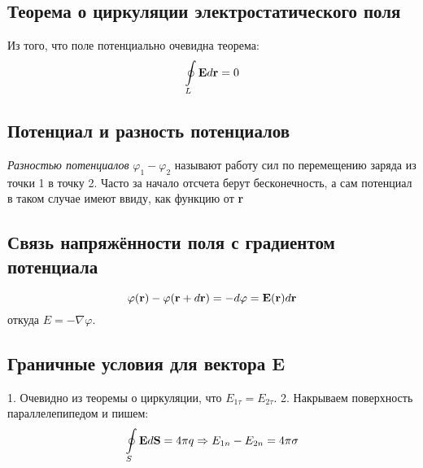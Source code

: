 \documentclass[a4paper,12pt]{article} %
\begin{document}
\subsection {Теорема о циркуляции электростатического поля}
Из того, что поле потенциально очевидна теорема:
\begin{equation}
	\oint\limits_L {\bf E} d {\bf r} = 0
\end{equation}
\subsection{Потенциал и разность потенциалов}
{\it Разностью потенциалов} $\varphi_1 - \varphi_2$ называют работу сил по перемещению заряда из точки 1 в точку 2. Часто за начало отсчета берут бесконечность, а сам потенциал в таком случае имеют ввиду, как функцию от {\bf r}
\subsection{Связь напряжённости поля с градиентом потенциала}
\begin{equation}
	\varphi ({\bf r}) - \varphi ({\bf r} + d  {\bf r}) = - d \varphi = {\bf E(r)} d {\bf r}
\end{equation}
откуда $E = - \nabla \varphi$.
\subsection{Граничные условия для вектора {\bf E}}
1. Очевидно из теоремы о циркуляции, что $E_{1\tau} = E_{2 \tau}$.
2. Накрываем поверхность параллелепипедом и пишем:
\begin{equation}
	\oint\limits_S {\bf E} d {\bf S} = 4 \pi q \Rightarrow E_{1n} - E_{2n} = 4 \pi \sigma
\end{equation}
\end{document}
